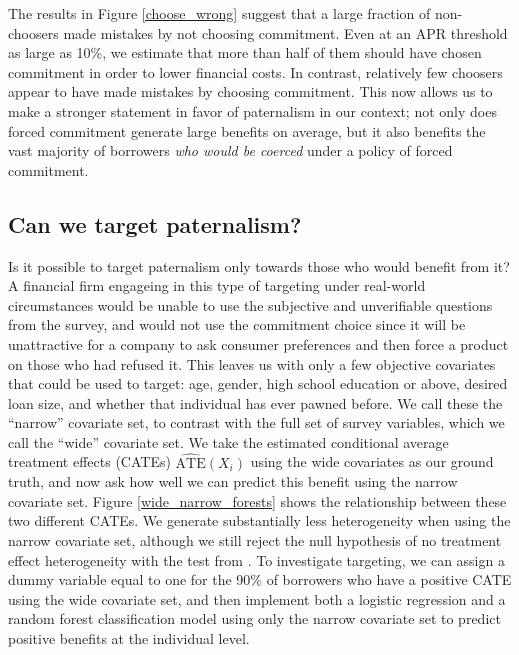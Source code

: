 \documentclass[12pt, a4paper]{article}
\begin{document}
The results in Figure \ref{choose_wrong} suggest that a large fraction of non-choosers made mistakes by not choosing commitment.
Even at an APR threshold as large as 10\%, we estimate that more than half of them should have chosen commitment in order to lower financial costs.
In contrast, relatively few choosers appear to have made mistakes by choosing commitment.
This now allows us to make a stronger statement in favor of paternalism in our context; not only does forced commitment generate large benefits on average, but it also benefits the vast majority of borrowers \emph{who would be coerced} under a policy of forced commitment.



\subsection{Can we target paternalism?}

Is it possible to target paternalism only towards those who would benefit from it?  A financial firm engageing in this type of targeting under real-world circumstances would be unable to use the subjective and unverifiable questions from the survey, and would not use the commitment choice since it will be unattractive for a company to ask consumer preferences and then force a product on those who had refused it. This leaves us with only a few objective covariates that could be used to target: age, gender, high school education or above, desired loan size, and whether that individual has ever pawned before. 
We call these the ``narrow'' covariate set, to contrast with the full set of survey variables, which we call the ``wide'' covariate set.  We take the estimated conditional average treatment effects (CATEs) $\widehat{\text{ATE}}(X_i)$ using the wide covariates as our ground truth, and now ask how well we can predict this benefit using the narrow covariate set.  Figure \ref{wide_narrow_forests} shows the relationship between these two different  CATEs.  We generate substantially less heterogeneity when using the narrow covariate set, although we still reject the null hypothesis of no treatment effect heterogeneity with the test from \cite{chernozhukov2018generic}.   To investigate targeting, we can assign a dummy variable equal to one for the 90\% of borrowers who have a positive CATE using the wide covariate set, and then implement both a logistic regression and a random forest classification model using only the narrow covariate set to predict positive benefits at the individual level.  
\end{document}
